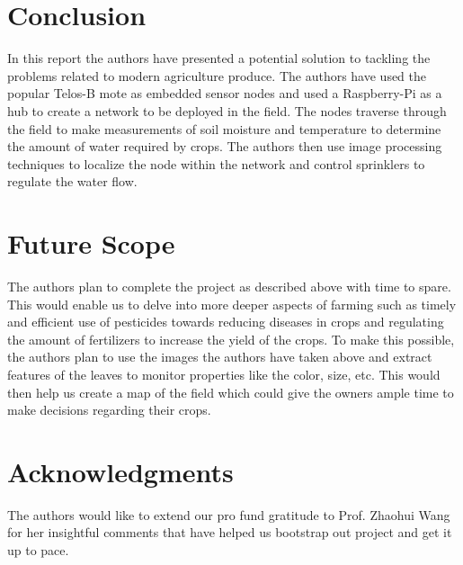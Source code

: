 \documentclass{sig-alternate-05-2015}
\begin{document}
\section{Conclusion}
In this report the authors have presented a potential solution to tackling the problems related to modern agriculture produce. The authors have used the popular Telos-B mote as embedded sensor nodes and used a Raspberry-Pi as a hub to create a network to be deployed in the field. The nodes traverse through the field to make measurements of soil moisture and temperature to determine the amount of water required by crops. The authors then use image processing techniques to localize the node within the network and control sprinklers to regulate the water flow.

\section{Future Scope}
The authors plan to complete the project as described above  with time to spare. This would enable us to delve into more deeper aspects of farming such as timely and efficient use of pesticides towards reducing diseases in crops and regulating the amount of fertilizers to increase the yield of the crops. To make this possible, the authors plan to use the images the authors have taken above and extract features of the leaves to monitor properties like the color, size, etc. This would then help us create a map of the field which could give the owners ample time to make decisions regarding their crops.


\section{Acknowledgments}
The authors would like to extend our pro fund gratitude to Prof. Zhaohui Wang for her insightful comments that have helped us bootstrap out project and get it up to pace.



\end{document}
